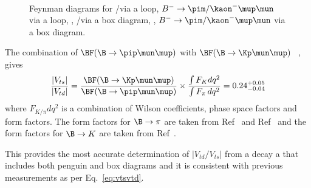 \begin{figure}[!h]\def\nh{0.5\textwidth}
  \centering
  \hspace*{-1cm}
  \\
  \hspace*{-1cm}
  \caption{Feynman diagrams for \protect{} \Lb\to\proton\pim/\Km\mup\mun via a loop,  \protect{} $B^{-}\to\pim/\kaon^{-}\mup\mun$ via a loop,  \protect{}, \Lb\to\proton\pim/\Km\mup\mun via a box diagram,
   \protect{}, $B^{-}\to\pim/\kaon^{-}\mup\mun$ via a box diagram.
  }
  \label{fig:boxpeng}
\end{figure}
The combination of $\BF(\B\to\pip\mun\mup)$ with $\BF(\B\to\Kp\mun\mup)$ ~\cite{bKmumu},  gives
\begin{equation}
  \frac{|V_{ts}|}{|V_{td}|} = \frac{\BF(\B\to\Kp\mun\mup)}{\BF(\B\to\pip\mun\mup)} \times \frac{\int F_{K}d q^{2}}{\int F_{\pi}\,dq^{2}} = 0.24^{+0.05}_{-0.04}
  \end{equation}
where $F_{K/\pi}d q^{2}$ is a combination of Wilson coefficients, phase space factors and form factors. The form factors for $\B\to\pi$ are taken from Ref~\cite{bpimumuff1} and Ref~\cite{bpimumuff2} and the form factors for $\B\to K$ are taken from Ref~\cite{bKmumuff1}.

This provides the most accurate determination of $|V_{td}/V_{ts}|$ from a decay a that includes both penguin and box diagrams and it is consistent with previous measurements as per Eq.~\ref{eq:vtsvtd}.

